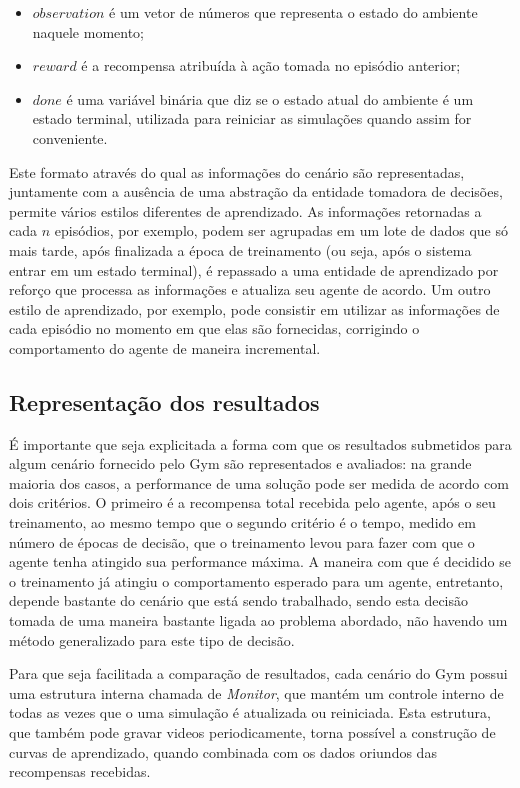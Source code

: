 \documentclass[cic,tc]{iiufrgs}
\begin{document}
\begin{itemize}
  \item $observation$ é um vetor de números que representa o estado do ambiente
  naquele momento;
  \item $reward$ é a recompensa atribuída à ação tomada no episódio anterior;
  \item $done$ é uma variável binária que diz se o estado atual do ambiente é
  um estado terminal, utilizada para reiniciar as simulações quando assim for
  conveniente.
\end{itemize}

Este formato através do qual as informações do cenário são representadas,
juntamente com a ausência de uma abstração da entidade tomadora de decisões,
permite vários estilos diferentes de aprendizado. As informações retornadas a
cada $n$ episódios, por exemplo, podem ser agrupadas em um lote de dados que só
mais tarde, após finalizada a época de treinamento (ou seja, após o sistema
entrar em um estado terminal), é repassado a uma entidade de aprendizado por
reforço que processa as informações e atualiza seu agente de acordo. Um outro
estilo de aprendizado, por exemplo, pode consistir em utilizar as informações de
cada episódio no momento em que elas são fornecidas, corrigindo o comportamento
do agente de maneira incremental.

\subsection{Representação dos resultados}
É importante que seja explicitada a forma com que os resultados submetidos para
algum cenário fornecido pelo Gym são representados e avaliados: na grande
maioria dos casos, a performance de uma solução pode ser medida de acordo com
dois critérios. O primeiro é a recompensa total recebida pelo agente, após o seu
treinamento, ao mesmo tempo que o segundo critério é o tempo, medido em número
de épocas de decisão, que o treinamento levou para fazer com que o agente tenha
atingido sua performance máxima. A maneira com que é decidido se o treinamento
já atingiu o comportamento esperado para um agente, entretanto, depende bastante
do cenário que está sendo trabalhado, sendo esta decisão tomada de uma maneira
bastante ligada ao problema abordado, não havendo um método generalizado para
este tipo de decisão.


Para que seja facilitada a comparação de resultados, cada cenário do Gym possui
uma estrutura interna chamada de \textit{Monitor}, que mantém um controle
interno de todas as vezes que o uma simulação é atualizada ou reiniciada. Esta
estrutura, que também pode gravar videos periodicamente, torna possível a
construção de curvas de aprendizado, quando combinada com os dados oriundos das
recompensas recebidas.
\end{document}
